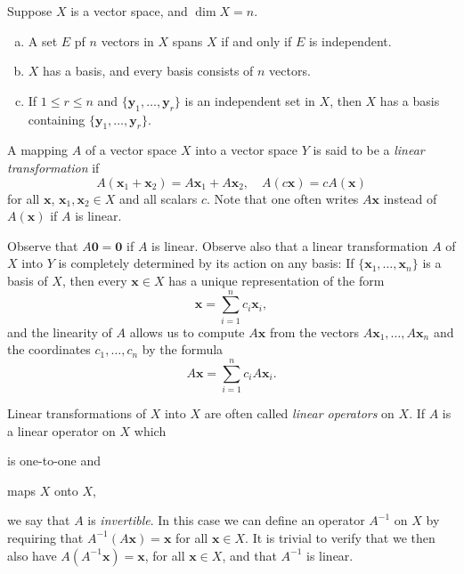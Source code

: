 \begin{thm}
    \label{thm:9.3}
    Suppose $X$ is a vector space, and $\dim X = n$.
    \begin{enumerate}[(a)]
        \item A set $E$ pf $n$ vectors in $X$ spans $X$ if and only if $E$ is independent.
        \item $X$ has a basis, and every basis consists of $n$ vectors.
        \item If $1 \leq r \leq n$ and $\{\mathbf{y}_1, \dots , \mathbf{y}_r\}$ is an independent set in $X$, then $X$ has a basis containing $\{\mathbf{y}_1, \dots , \mathbf{y}_r\}$.
    \end{enumerate}
\end{thm}


\begin{myDef}
    A mapping $A$ of a vector space $X$ into a vector space $Y$ is said to be a \emph{linear transformation} if 
    \begin{equation*}
        A(\mathbf{x}_1 + \mathbf{x}_2) =
        A\mathbf{x}_1 + A\mathbf{x}_2 ,
        \quad
        A(c\mathbf{x}) = 
        cA(\mathbf{x})
    \end{equation*}
    for all $\mathbf{x}$, $\mathbf{x}_1, \mathbf{x}_2 \in X$ and all scalars $c$.
    Note that one often writes $A \mathbf{x}$ instead of $A(\mathbf{x})$ if $A$ is linear.

    Observe that $A \mathbf{0} = \mathbf{0}$ if $A$ is linear.
    Observe also that a linear transformation $A$ of $X$ into $Y$ is completely determined by its action on any basis:
    If $\{\mathbf{x}_1, \dots , \mathbf{x}_n\}$ is a basis of $X$,
    then every $\mathbf{x} \in X$ has a unique representation of the form 
    \begin{equation*}
        \mathbf{x} = \sum_{i=1}^{n} c_i \mathbf{x}_i ,
    \end{equation*}
    and the linearity of $A$ allows us to compute $A \mathbf{x}$ from the vectors $A \mathbf{x}_1, \dots , A \mathbf{x}_n$ and the coordinates $c_1, \dots, c_n$ by the formula 
    \begin{equation*}
        A \mathbf{x} = \sum_{i=1}^{n} c_i A \mathbf{x}_i .
    \end{equation*}

    Linear transformations of $X$ into $X$ are often called \emph{linear operators} on $X$.
    If $A$ is a linear operator on $X$ which 
    \begin{inparaenum}[(i)]
        \item is one-to-one and 
        \item maps $X$ onto $X$,
    \end{inparaenum}
    we say that $A$ is \emph{invertible}.
    In this case we can define an operator $A^{-1}$ on $X$ by requiring that $A^{-1}(A \mathbf{x}) = \mathbf{x}$ for all $\mathbf{x} \in X$.
    It is trivial to verify that we then also have $A(A^{-1}\mathbf{x}) = \mathbf{x}$, for all $\mathbf{x} \in X$, and that $A^{-1}$ is linear.
\end{myDef}

